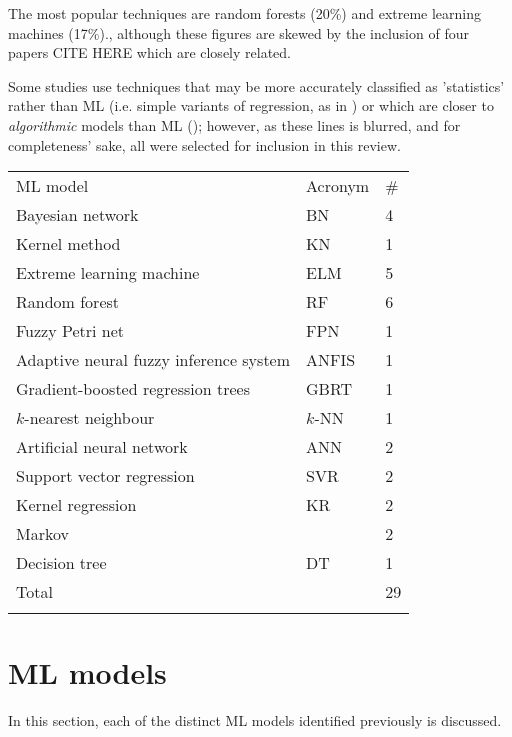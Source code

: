 \documentclass{article}
\begin{document}
The most popular techniques are random forests (20\%) and extreme learning machines (17\%)., although these figures are skewed by the inclusion of four papers CITE HERE which are closely related.

Some studies use techniques that may be more accurately classified as 'statistics' rather than ML (i.e. simple variants of regression, as in \cite{pongnumkul_pechprasarn_kunaseth_chaipah_2014}\cite{wang_work_2015}) or which are closer to \textit{algorithmic} models than ML (\cite{hansen_goverde_van_der_meer_2010}); however, as these lines is blurred, and for completeness' sake, all were selected for inclusion in this review.

\begin{table}[h]
\begin{tabular}{lll}
\noalign{\smallskip}\hline \noalign{\smallskip}
ML model & Acronym & \# \\ 	\noalign{\smallskip}\hline \noalign{\smallskip}
Bayesian network & BN & 4 \\
Kernel method & KN & 1 \\
Extreme learning machine & ELM & 5 \\
Random forest & RF & 6 \\
Fuzzy Petri net & FPN & 1 \\
Adaptive neural fuzzy inference system & ANFIS & 1 \\
Gradient-boosted regression trees & GBRT & 1 \\
$k$-nearest neighbour & $k$-NN & 1 \\
Artificial neural network & ANN & 2 \\
Support vector regression & SVR & 2 \\
Kernel regression & KR & 2 \\
Markov &  & 2 \\
Decision tree & DT & 1 \\ 	\noalign{\smallskip}
Total                                    &         & 29	\\ \noalign{\smallskip} \hline
\end{tabular}
\end{table}

\section{ML models}

In this section, each of the distinct ML models identified previously is discussed.

\end{document}
